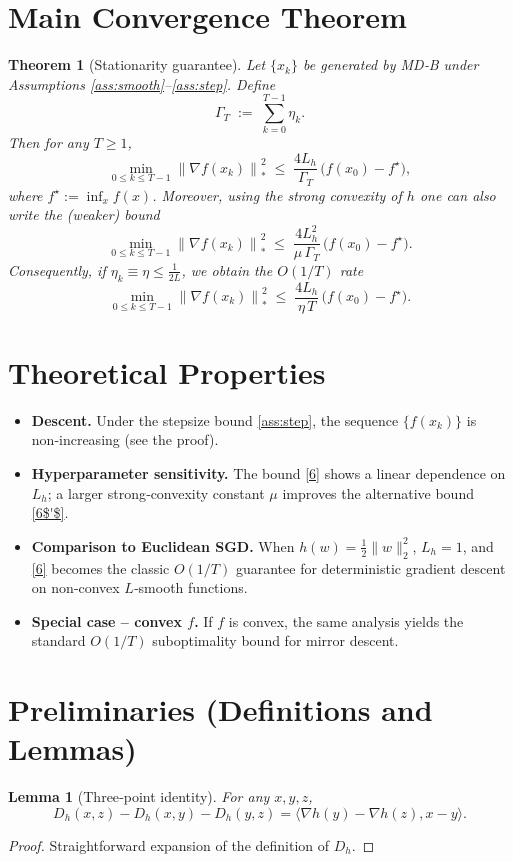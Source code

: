 \documentclass{article}
\newtheorem{theorem}{Theorem}
\newtheorem{lemma}{Lemma}
\newcommand{\dualnorm}[1]{\left\lVert#1\right\rVert_{*}}
\newcommand{\inner}[2]{\langle #1,#2\rangle}
\newcommand{\D}[2]{D_{h}(#1,#2)}
\begin{document}
\section*{Main Convergence Theorem}
\begin{theorem}[Stationarity guarantee]\label{thm:main}
Let $\{x_k\}$ be generated by MD‑B under Assumptions
\ref{ass:smooth}–\ref{ass:step}. Define
\[
\Gamma_T\;:=\;\sum_{k=0}^{T-1}\eta_k .
\]
Then for any $T\ge 1$,
\[
\min_{0\le k\le T-1}
\dualnorm{\nabla f(x_k)}^{2}
\;\le\;
\frac{4L_h}{\Gamma_T}\,
\bigl(f(x_0)-f^\star\bigr),
\tag{6}
\]
where $f^\star:=\inf_{x}f(x)$. Moreover, using the strong convexity of
$h$ one can also write the (weaker) bound
\[
\min_{0\le k\le T-1}
\dualnorm{\nabla f(x_k)}^{2}
\;\le\;
\frac{4L_h^{2}}{\mu\,\Gamma_T}\,
\bigl(f(x_0)-f^\star\bigr).
\tag{6$'$}
\]
Consequently, if $\eta_k\equiv\eta\le \tfrac{1}{2L}$, we obtain the
$O(1/T)$ rate
\[
\min_{0\le k\le T-1}\dualnorm{\nabla f(x_k)}^{2}
\;\le\;
\frac{4L_h}{\eta\,T}\,
\bigl(f(x_0)-f^\star\bigr).
\]
\end{theorem}

\section*{Theoretical Properties}
\begin{itemize}[leftmargin=*]
\item \textbf{Descent.} Under the stepsize bound \eqref{ass:step}, the
sequence $\{f(x_k)\}$ is non‑increasing (see the proof).
\item \textbf{Hyperparameter sensitivity.}
The bound \eqref{6} shows a linear dependence on $L_h$; a larger
strong‑convexity constant $\mu$ improves the alternative bound
\eqref{6$'$}.
\item \textbf{Comparison to Euclidean SGD.}
When $h(w)=\tfrac12\|w\|_2^{2}$, $L_h=1$, and \eqref{6} becomes the
classic $O(1/T)$ guarantee for deterministic gradient descent on
non‑convex $L$‑smooth functions.
\item \textbf{Special case – convex $f$.}
If $f$ is convex, the same analysis yields the standard $O(1/T)$
suboptimality bound for mirror descent.
\end{itemize}

\section*{Preliminaries (Definitions and Lemmas)}
\begin{lemma}[Three‑point identity]\label{lem:three}
For any $x,y,z$,
\[
\D{x}{z}-\D{x}{y}-\D{y}{z}
    =\inner{\nabla h(y)-\nabla h(z)}{x-y}.
\tag{7}
\]
\end{lemma}
\begin{proof}
Straightforward expansion of the definition of $D_h$.
\end{proof}
\end{document}
